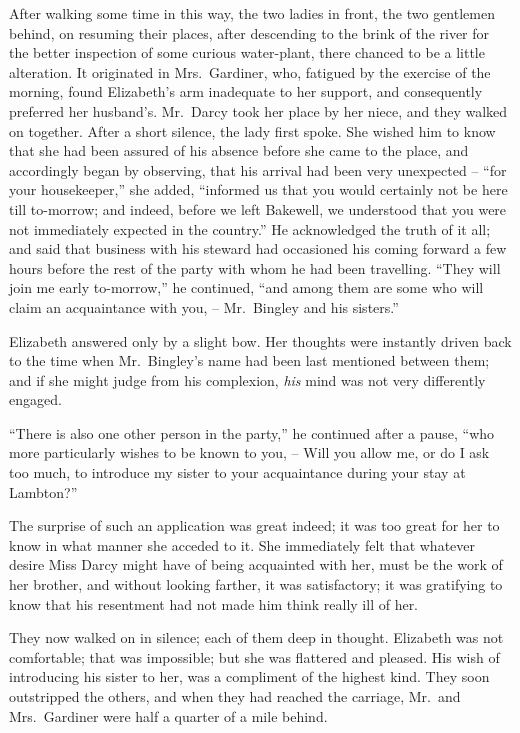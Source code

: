 After walking some time in this way, the two ladies in
front, the two gentlemen behind, on resuming their places,
after descending to the brink of the river for the better
inspection of some curious water-plant, there chanced to
be a little alteration. It originated in Mrs.\ Gardiner, who,
fatigued by the exercise of the morning, found Elizabeth’s
arm inadequate to her support, and consequently preferred
her husband’s. Mr.\ Darcy took her place by her niece, and
they walked on together. After a short silence, the lady
first spoke. She wished him to know that she had been
assured of his absence before she came to the place, and
accordingly began by observing, that his arrival had been
very unexpected -- “for your housekeeper,” she added,
“informed us that you would certainly not be here till
to-morrow; and indeed, before we left Bakewell, we understood
that you were not immediately expected in the
country.” He acknowledged the truth of it all; and said
that business with his steward had occasioned his coming
forward a few hours before the rest of the party with
whom he had been travelling. “They will join me early
to-morrow,” he continued, “and among them are some
who will claim an acquaintance with you, -- Mr.\ Bingley
and his sisters.”

Elizabeth answered only by a slight bow. Her thoughts
were instantly driven back to the time when Mr.\ Bingley’s
name had been last mentioned between them; and if she
might judge from his complexion, \textit{his} mind was not very
differently engaged.

“There is also one other person in the party,” he continued
after a pause, “who more particularly wishes to
be known to you, -- Will you allow me, or do I ask too
much, to introduce my sister to your acquaintance during
your stay at Lambton?”

The surprise of such an application was great indeed;
it was too great for her to know in what manner she
acceded to it. She immediately felt that whatever desire
Miss Darcy might have of being acquainted with her,
must be the work of her brother, and without looking
farther, it was satisfactory; it was gratifying to know that
his resentment had not made him think really ill of her.

They now walked on in silence; each of them deep in
thought. Elizabeth was not comfortable; that was
impossible; but she was flattered and pleased. His wish
of introducing his sister to her, was a compliment of the
highest kind. They soon outstripped the others, and
when they had reached the carriage, Mr.\ and Mrs.\ Gardiner
were half a quarter of a mile behind.

